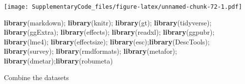 \documentclass[
]{book}
\newenvironment{Shaded}{\begin{snugshade}}{\end{snugshade}}
\newcommand{\KeywordTok}[1]{\textcolor[rgb]{0.13,0.29,0.53}{\textbf{#1}}}
\newcommand{\NormalTok}[1]{#1}
\begin{document}
\texttt{[image: SupplementaryCode\_files/figure-latex/unnamed-chunk-72-1.pdf]}

\begin{Shaded}
\begin{Highlighting}[]
\KeywordTok{library}\NormalTok{(markdown); }\KeywordTok{library}\NormalTok{(knitr); }\KeywordTok{library}\NormalTok{(gt); }\KeywordTok{library}\NormalTok{(tidyverse); }\KeywordTok{library}\NormalTok{(ggExtra); }\KeywordTok{library}\NormalTok{(effects); }\KeywordTok{library}\NormalTok{(readxl); }\KeywordTok{library}\NormalTok{(ggpubr); }\KeywordTok{library}\NormalTok{(lme4); }\KeywordTok{library}\NormalTok{(effectsize); }\KeywordTok{library}\NormalTok{(esc);}\KeywordTok{library}\NormalTok{(DescTools); }\KeywordTok{library}\NormalTok{(survey); }\KeywordTok{library}\NormalTok{(rmdformats); }\KeywordTok{library}\NormalTok{(metafor); }\KeywordTok{library}\NormalTok{(dmetar);}\KeywordTok{library}\NormalTok{(robumeta)}
\end{Highlighting}
\end{Shaded}

Combine the datasets
\end{document}
